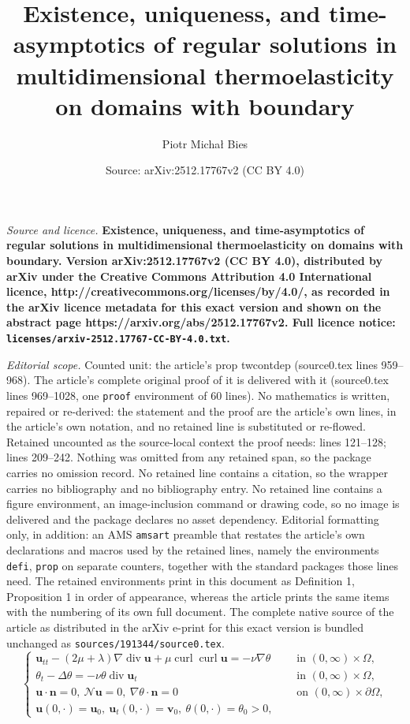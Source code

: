 \documentclass[10pt,a4paper]{amsart}
\title{\bf Existence, uniqueness, and time-asymptotics of regular solutions in multidimensional thermoelasticity on domains with boundary}
\author{Piotr Micha{\l} Bies}
\date{Source: arXiv:2512.17767v2 (CC BY 4.0)}
\newcommand{\N}{\mathcal{N}}
\newcommand\bb[1]{\mathbf{#1}}
\DeclareMathOperator{\curl}{curl}
\renewcommand{\div}{\operatorname{div}}
\newcommand{\ot}{(0,\infty)\times\Omega}
\begin{document}
\maketitle

\noindent\emph{Source and licence.} \bf Existence, uniqueness, and time-asymptotics of regular solutions in multidimensional thermoelasticity on domains with boundary. Version arXiv:2512.17767v2 (CC BY 4.0), distributed by arXiv under the Creative Commons Attribution 4.0 International licence, http://creativecommons.org/licenses/by/4.0/, as recorded in the arXiv licence metadata for this exact version and shown on the abstract page https://arxiv.org/abs/2512.17767v2. Full licence notice: \texttt{licenses/arxiv-2512.17767-CC-BY-4.0.txt}.\par\smallskip

\noindent\textit{Editorial scope.} Counted unit: the article's prop twcontdep (source0.tex lines 959--968). The article's complete original proof of it is delivered with it (source0.tex lines 969--1028, one \texttt{proof} environment of 60 lines). No mathematics is written, repaired or re-derived: the statement and the proof are the article's own lines, in the article's own notation, and no retained line is substituted or re-flowed.  Retained uncounted as the source-local context the proof needs: lines 121--128; lines 209--242.  Nothing was omitted from any retained span, so the package carries no omission record.  No retained line contains a citation, so the wrapper carries no bibliography and no bibliography entry.  No retained line contains a figure environment, an image-inclusion command or drawing code, so no image is delivered and the package declares no asset dependency.  Editorial formatting only, in addition: an AMS \texttt{amsart} preamble that restates the article's own declarations and macros used by the retained lines, namely the environments \texttt{defi}, \texttt{prop} on separate counters, together with the standard packages those lines need.  The retained environments print in this document as Definition 1, Proposition 1 in order of appearance, whereas the article prints the same items with the numbering of its own full document.  The complete native source of the article as distributed in the arXiv e-print for this exact version is bundled unchanged as \texttt{sources/191344/source0.tex}.
\begin{equation}\label{system}
\begin{cases}
\bb{u}_{tt}- (2\mu+\lambda)\nabla\div\bb u+\mu\curl\curl\bb u =-\nu\nabla\theta & \quad \text{ in } \ot,\\
\theta_t - \Delta \theta =- \nu\theta \div\bb{u}_t& \quad \text{ in }  \ot,\\
\bb u\cdot\bb n=0,\ \N\bb u=0,\ \nabla\theta\cdot\bb n=0 &\quad\text{ on } (0,\infty)\times\partial\Omega,\\
\bb{u}(0,\cdot)=\bb{u}_0,\ \bb{u}_t(0,\cdot) = \bb{v}_0,\ \theta(0,\cdot)=\theta_0>0,&
\end{cases}
\end{equation}
\end{document}
